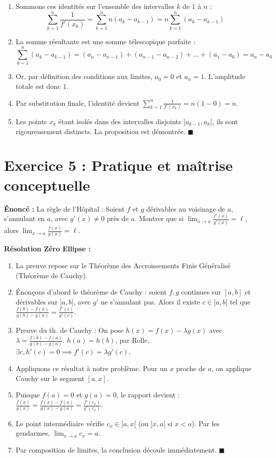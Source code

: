 \documentclass[11pt,a4paper]{article}
\begin{document}
\begin{enumerate}
    \[  \frac{1}{n} = f'(x_k)(a_k - a_{k-1}) \implies \frac{1}{f'(x_k)} = n(a_k - a_{k-1})  \]
\item Sommons ces identités sur l'ensemble des intervalles $k$ de $1$ à $n$ :
    \[  \sum_{k=1}^n \frac{1}{f'(x_k)} = \sum_{k=1}^n n(a_k - a_{k-1}) = n \sum_{k=1}^n (a_k - a_{k-1})  \]
\item La somme résultante est une somme télescopique parfaite :
    \[  \sum_{k=1}^n (a_k - a_{k-1}) = (a_n - a_{n-1}) + (a_{n-1} - a_{n-2}) + \dots + (a_1 - a_0) = a_n - a_0  \]
\item Or, par définition des conditions aux limites, $a_0 = 0$ et $a_n = 1$. L'amplitude totale est donc $1$.
\item Par substitution finale, l'identité devient $\sum_{k=1}^n \frac{1}{f'(x_k)} = n(1 - 0) = n$.
\item Les points $x_k$ étant isolés dans des intervalles disjoints $]a_{k-1}, a_k[$, ils sont rigoureusement distincts. La proposition est démontrée. $\blacksquare$
\end{enumerate}


\vspace{1em}

\section*{Exercice 5 : Pratique et maîtrise conceptuelle}

\textbf{Énoncé :}
La règle de l'Hôpital : Soient $f$ et $g$ dérivables au voisinage de $a$, s'annulant en $a$, avec $g'(x) \neq 0$ près de $a$. Montrer que si $\lim_{x \to a} \frac{f'(x)}{g'(x)} = \ell$, alors $\lim_{x \to a} \frac{f(x)}{g(x)} = \ell$.

\textbf{Résolution Zéro Ellipse :}
\begin{enumerate}
\item La preuve repose sur le Théorème des Accroissements Finis Généralisé (Théorème de Cauchy).
\item Énonçons d'abord le théorème de Cauchy : soient $f,g$ continues sur $[a,b]$ et dérivables sur $]a,b[$, avec $g'$ ne s'annulant pas. Alors il existe $c \in ]a,b[$ tel que $\frac{f(b)-f(a)}{g(b)-g(a)} = \frac{f'(c)}{g'(c)}$.
\item Preuve du th. de Cauchy : On pose $h(x) = f(x) - \lambda g(x)$ avec $\lambda = \frac{f(b)-f(a)}{g(b)-g(a)}$. $h(a) = h(b)$, par Rolle, $\exists c, h'(c) = 0 \implies f'(c) = \lambda g'(c)$.
\item Appliquons ce résultat à notre problème. Pour un $x$ proche de $a$, on applique Cauchy sur le segment $[a, x]$.
\item Puisque $f(a) = 0$ et $g(a) = 0$, le rapport devient : $\frac{f(x)}{g(x)} = \frac{f(x)-f(a)}{g(x)-g(a)} = \frac{f'(c_x)}{g'(c_x)}$.
\item Le point intermédiaire vérifie $c_x \in ]a, x[$ (ou $]x, a[$ si $x < a$). Par les gendarmes, $\lim_{x \to a} c_x = a$.
\item Par composition de limites, la conclusion découle immédiatement. $\blacksquare$
\end{enumerate}
\end{document}
